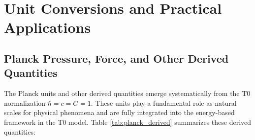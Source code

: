 \documentclass[twocolumn,aps,prl]{revtex4-2}
\begin{document}
	\section{Unit Conversions and Practical Applications}
	\label{sec:conversions}
	
	\subsection{Planck Pressure, Force, and Other Derived Quantities}
	\label{subsec:planck_derived}
	
	The Planck units and other derived quantities emerge systematically from the T0 normalization $\hbar = c = G = 1$. These units play a fundamental role as natural scales for physical phenomena and are fully integrated into the energy-based framework in the T0 model. Table \ref{tab:planck_derived} summarizes these derived quantities:
	
\end{document}
